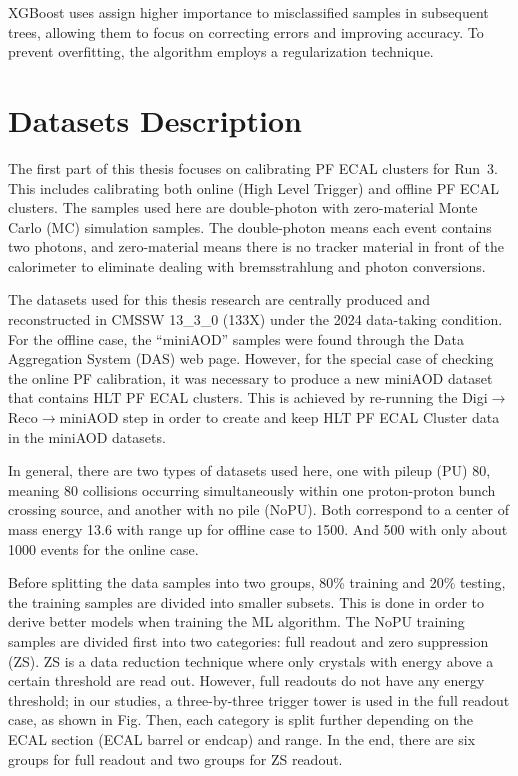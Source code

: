 XGBoost uses assign higher importance to misclassified samples in subsequent trees, allowing them to focus on correcting errors and improving accuracy.
To prevent overfitting, %
the algorithm employs a regularization technique.


\section{Datasets Description}
The first part of this thesis focuses on calibrating PF ECAL clusters for Run~3.
This includes calibrating both online (High Level Trigger) and offline PF ECAL clusters.
The samples used here are double-photon with zero-material Monte Carlo (MC) simulation samples.
The double-photon means each event contains two photons, and zero-material means there is no tracker material in front of the calorimeter to eliminate dealing with bremsstrahlung and photon conversions.

The datasets used for this thesis research are centrally produced and reconstructed in CMSSW 13\_3\_0 (133X) under the 2024 data-taking condition.
For the offline case, the ``miniAOD'' samples were found through the Data Aggregation System (DAS) web page.
However, for the special case of checking the online PF calibration, it was necessary to produce a new miniAOD dataset that contains HLT PF ECAL clusters.
This is achieved by re-running the Digi$\rightarrow$Reco$\rightarrow$miniAOD step in order to create and keep HLT PF ECAL Cluster data in the miniAOD datasets.

In general, there are two types of datasets used here, one with pileup (PU) 80, meaning 80 collisions occurring simultaneously within one proton-proton bunch crossing source, and another with no pile (NoPU).
Both correspond to a center of mass energy 13.6 \TeV with \pt range up for offline case to 1500\GeV{}. And 500\GeV{} with only about 1000 events for the online case.

Before splitting the data samples into two groups, 80\% training and 20\% testing, the training samples are divided into smaller subsets.
This is done in order to derive better models when training the ML algorithm.
The NoPU training samples are divided first into two categories: full readout and zero suppression (ZS). ZS is a data reduction technique where only crystals with energy above a certain threshold are read out. However, full readouts do not have any energy threshold; in our studies, a three-by-three trigger tower is used in the full readout case, as shown in Fig.
Then, each category is split further depending on the ECAL section (ECAL barrel or endcap) and \pt range.
In the end, there are six groups for full readout and two groups for ZS readout.


